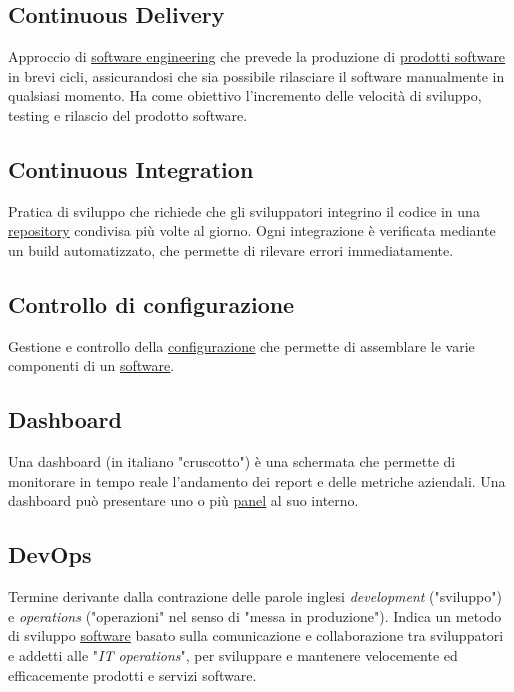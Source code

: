 	\subsection{Continuous Delivery}
	\label{sec:continuousdelivery}
	Approccio di \underline{\hyperref[sec:swe]{software engineering}} che prevede la produzione di \underline{\hyperref[sec:prodottosoftware]{prodotti software}} in brevi cicli, assicurandosi che sia possibile rilasciare il software manualmente in qualsiasi momento. Ha come obiettivo l'incremento delle velocità di sviluppo, testing e rilascio del prodotto software.

	\subsection{Continuous Integration}
	\label{sec:continuousintegration}
	Pratica di sviluppo che richiede che gli sviluppatori integrino il codice in una \underline{\hyperref[sec:repo]{repository}} condivisa più volte al giorno. Ogni integrazione è verificata mediante un build automatizzato, che permette di rilevare errori immediatamente.

	\subsection{Controllo di configurazione}
	\label{sec:controlloconfigurazione}
	Gestione e controllo della \underline{\hyperref[sec:configurazione]{configurazione}} che permette di assemblare le varie componenti di un \underline{\hyperref[sec:prodottosoftware]{software}}.\newpage



	\subsection{Dashboard}
	\label{sec:dashboard}
	Una dashboard (in italiano "cruscotto") è una schermata che permette di monitorare in tempo reale l’andamento dei report e delle metriche aziendali. Una dashboard può presentare uno o più \underline{\hyperref[sec:panel]{panel}} al suo interno.

	\subsection{DevOps}
	\label{sec:devops}
	Termine derivante dalla contrazione delle parole inglesi \emph{development} ("sviluppo") e \emph{operations} ("operazioni" nel senso di "messa in produzione"). Indica un metodo di sviluppo \underline{\hyperref[sec:prodottosoftware]{software}} basato sulla comunicazione e collaborazione tra sviluppatori e addetti alle "\emph{IT operations}", per sviluppare e mantenere velocemente ed efficacemente prodotti e servizi software.


